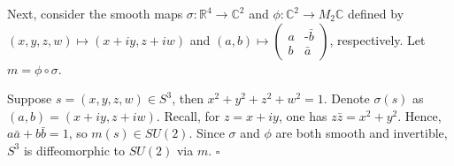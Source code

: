 \documentclass{article}
\newcommand{\R}{\mathbb{R}}
\newcommand{\C}{\mathbb{C}}
\begin{document}
  Next, consider the smooth maps $\sigma\colon\R^4\to\C^2$ and $\phi\colon\C^2
  \to M_2\C$ defined by $(x,y,z,w)\mapsto(x+iy, z+iw)$ and $(a,b)\mapsto
  \left(
    \begin{smallmatrix}
      a & \text{-}\bar{b}\\
      b & \bar{a}
    \end{smallmatrix}
  \right)$, respectively. Let $m=\phi\circ\sigma$.

  Suppose $s=(x,y,z,w)\in S^3$, then $x^2+y^2+z^2+w^2=1$. Denote $\sigma(s)$ as
  $(a,b)=(x+iy,z+iw)$. Recall, for $z=x+iy$, one has $z\bar{z}=x^2+y^2$. Hence,
  $a\bar{a}+b\bar{b}=1$, so $m(s)\in SU(2)$. Since $\sigma$ and $\phi$ are both
  smooth and invertible, $S^3$ is diffeomorphic to $SU(2)$ via $m$.
  \hfill $\square$
\end{document}
